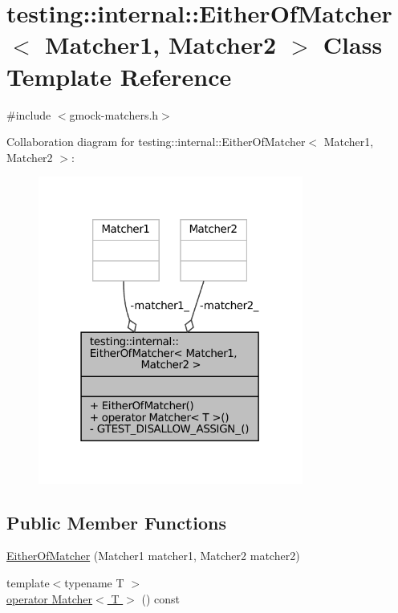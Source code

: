 \hypertarget{classtesting_1_1internal_1_1EitherOfMatcher}{}\section{testing\+:\+:internal\+:\+:Either\+Of\+Matcher$<$ Matcher1, Matcher2 $>$ Class Template Reference}
\label{classtesting_1_1internal_1_1EitherOfMatcher}


{\ttfamily \#include $<$gmock-\/matchers.\+h$>$}



Collaboration diagram for testing\+:\+:internal\+:\+:Either\+Of\+Matcher$<$ Matcher1, Matcher2 $>$\+:
\nopagebreak
\begin{figure}[H]
\begin{center}
\leavevmode
\includegraphics[width=247pt]{classtesting_1_1internal_1_1EitherOfMatcher__coll__graph}
\end{center}
\end{figure}
\subsection*{Public Member Functions}
\begin{DoxyCompactItemize}
\item 
\hyperlink{classtesting_1_1internal_1_1EitherOfMatcher_a5ae2361f20a0460870b72b83fcc0c643}{Either\+Of\+Matcher} (Matcher1 matcher1, Matcher2 matcher2)
\item 
{\footnotesize template$<$typename T $>$ }\\\hyperlink{classtesting_1_1internal_1_1EitherOfMatcher_aef76a8b45451ec7abf845a2b9dd74bfb}{operator Matcher$<$ T $>$} () const
\end{DoxyCompactItemize}
